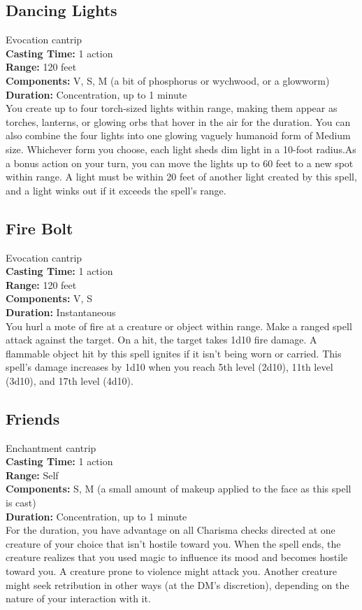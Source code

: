 \documentclass[11pt, A4paper, english]{article}
\begin{document}
		\subsection{Dancing Lights}
Evocation cantrip \\
\textbf{Casting Time:} 1 action \\
\textbf{Range:} 120 feet \\
\textbf{Components:} V, S, M (a bit of phosphorus or wychwood, or a glowworm) \\
\textbf{Duration:} Concentration, up to  1  minute \\
You create up to four torch-sized lights within range, making them appear as torches, lanterns, or glowing orbs that hover in the air for the duration. You can also combine the four lights into one glowing vaguely humanoid form of Medium size. Whichever form you choose, each light sheds dim light in a  10-foot radius.As a bonus action on your turn, you can move the lights up to 60 feet to a new spot within range. A light must be within 20 feet of another light created by this spell, and a light winks out if it exceeds the spell’s range.

		\subsection{Fire Bolt}
Evocation cantrip \\
\textbf{Casting Time:} 1 action \\
\textbf{Range:} 120 feet \\
\textbf{Components:} V, S \\
\textbf{Duration:} Instantaneous \\
You hurl a mote of fire at a creature or object within range. Make a ranged spell attack against the target. On a hit, the target takes  1d10 fire damage. A flammable object hit by this spell ignites if it isn't being worn or carried. This spell's damage increases by 1d10 when you reach 5th level (2d10), 11th level (3d10), and 17th level (4d10).

		\subsection{Friends}
Enchantment cantrip \\
\textbf{Casting Time:} 1 action \\
\textbf{Range:} Self \\
\textbf{Components:} S, M (a small amount of makeup applied to the face as this spell is cast) \\
\textbf{Duration:} Concentration, up to 1 minute \\
For the duration, you have advantage on all Charisma checks directed at one creature of your choice that isn't hostile toward you. When the spell ends, the creature realizes that you used magic to influence its mood and becomes hostile toward you. A creature prone to violence might attack you. Another creature might seek retribution in other ways (at the DM's discretion), depending on the nature of your interaction with it.
\end{document}
